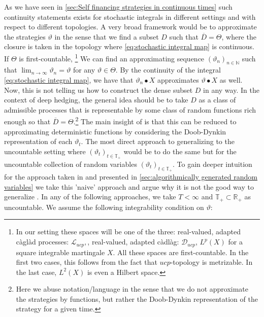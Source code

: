 \documentclass[11pt]{report}
\theoremstyle{plain} %
\theoremstyle{definition} %
\theoremstyle{remark} %
\begin{document}
As we have seen in \cref{sec:Self financing strategies in continuous times} such continuity statements exists for stochastic integrals in different settings and with respect to different topologies. A very broad framework would be to approximate the strategies \(\vartheta\) in the sense that we find a subset \(D\) such that \(\overline{D}=\Theta\), where the closure is taken in the topology where \cref{eq:stochastic integral map} is continuous. If \(\Theta\) is first-countable, \footnote{In our setting these spaces will be one of the three: real-valued, adapted càglàd processes: \(\mathcal{L}_{ucp},\), real-valued, adapted càdlàg: \(\mathcal{D}_{ucp}\), \(L^p(X)\) for a square integrable martingale \(X\). All these spaces are first-countable. In the first two cases, this follows from the fact that \(ucp\)-topology is metrizable. In the last case, \(L^2(X)\) is even a Hilbert space.} We can find an approximating sequence \((\vartheta_n)_{n\in\mathbb{N}}\) such that \(\lim_{n\to\infty}\vartheta_n=\vartheta\) for any \(\vartheta\in\Theta\). By the continuity of the integral \cref{eq:stochastic integral map}, we have that \(\vartheta_n\bullet X\) approximates \(\vartheta\bullet X\) as well. Now, this is not telling us how to construct the dense subset \(D\) in any way. In the context of deep hedging, the general idea should be to take \(D\) as a class of admissible processes that is representable by some class of random functions rich enough so that \(\overline{D}=\Theta\).\footnote{Here we abuse notation/language in the sense that we do not approximate the strategies by functions, but rather the Doob-Dynkin representation of the strategy for a given time.} The main insight of \parencite{Buehler2018DeepHedging} is that this can be reduced to approximating deterministic functions by considering the Doob-Dynkin representation of each \(\vartheta_t\). The most direct approach to generalizing \parencite{Buehler2018DeepHedging} to the uncountable setting where \((\vartheta_t)_{t\in\mathbb{
T}_+}\) would be to do the same but for the uncountable collection of random variables \((\vartheta_t)_{t\in\mathbb{
T}_+}\). To gain deeper intuition for the approach taken in \parencite{Arandjelovic2025} and presented in \cref{sec:algorithmically generated random variables} we take this 'naive' approach and argue why it is not the good way to generalize \parencite{Buehler2018DeepHedging}. 
\bigbreak
In any of the following approaches, we take \(T<\infty\) and \(\mathbb{T}_+\subset\mathbb{R}_+\) as uncountable. We assume the following integrability condition on \(\vartheta\):
\end{document}
